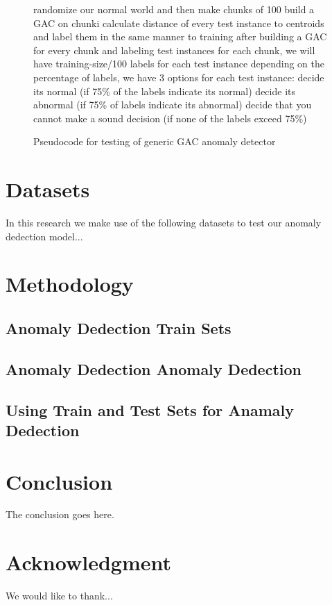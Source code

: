\documentclass[conference]{IEEEtran}
\begin{document}
\begin{figure}
\renewcommand{\baselinestretch}{1}
\begin{algorithmic} \footnotesize
\STATE randomize our normal world and then make chunks of 100
\STATE build a GAC on chunki
\STATE calculate distance of every test instance to centroids and label them in the same manner to training
\STATE after building a GAC for every chunk and labeling test instances for each chunk, we will have training-size/100 labels for each test instance
\STATE depending on the percentage of labels, we have 3 options for each test instance: 
\STATE decide its normal (if 75\% of the labels indicate its normal)
\STATE decide its abnormal (if 75\% of labels indicate its abnormal) 
\STATE decide that you cannot make a sound decision (if none of the labels exceed 75\%)
\end{algorithmic}
\caption{Pseudocode for testing of generic GAC anomaly detector}
\label{figure:testPseudocode}
\end{figure}

\section{Datasets}

In this research we make use of the following datasets to test our
anomaly dedection model...


\section{Methodology}


\subsection{Anomaly Dedection Train Sets}


\subsection{Anomaly Dedection Anomaly Dedection}



\subsection{Using Train and Test Sets for Anamaly Dedection}



\section{Conclusion}
The conclusion goes here.

\section{Acknowledgment}
We would like to thank...


\end{document}
